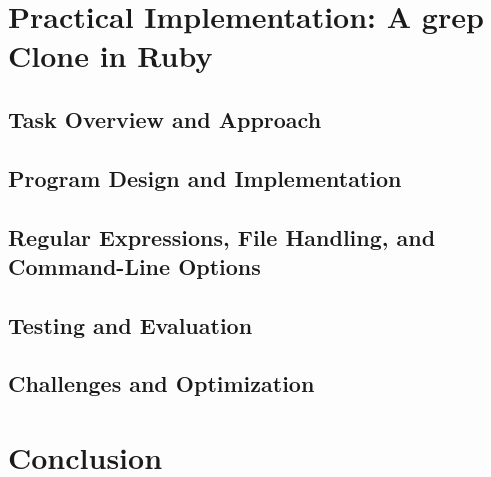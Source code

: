\documentclass[12pt,a4paper]{article}
\begin{document}
\section{Practical Implementation: A grep Clone in Ruby}
\subsection{Task Overview and Approach}
\subsection{Program Design and Implementation}
\subsection{Regular Expressions, File Handling, and Command-Line Options}
\subsection{Testing and Evaluation}
\subsection{Challenges and Optimization}

\section{Conclusion}
\end{document}
